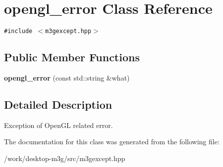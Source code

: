 \hypertarget{classm3g_1_1opengl__error}{
\section{opengl\_\-error Class Reference}
\label{classm3g_1_1opengl__error}
}
{\tt \#include $<$m3gexcept.hpp$>$}

\subsection*{Public Member Functions}
\begin{CompactItemize}
\item 
\hypertarget{classm3g_1_1opengl__error_ffe0f8c69cc4706e33b9360cdece7561}{
\textbf{opengl\_\-error} (const std::string \&what)}
\label{classm3g_1_1opengl__error_ffe0f8c69cc4706e33b9360cdece7561}

\end{CompactItemize}


\subsection{Detailed Description}
Exception of OpenGL related error. 

The documentation for this class was generated from the following file:\begin{CompactItemize}
\item 
/work/desktop-m3g/src/m3gexcept.hpp\end{CompactItemize}
